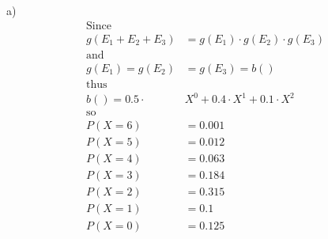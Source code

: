\documentclass[11pt]{article}
\begin{document}
a)
\begin{align*}
\text{Since}&\\
g(E_1 + E_2 + E_3) &= g(E_1) \cdot g(E_2) \cdot g(E_3)\\
\text{and}&\\
g(E_1) = g(E_2) &= g(E_3) = b()\\
\text{thus}&\\
b() = 0.5\cdot &X^0 + 0.4\cdot X^1 + 0.1\cdot X^2\\
\text{so}&\\
P(X = 6) &= 0.001\\
P(X = 5) &= 0.012\\
P(X = 4) &= 0.063\\
P(X = 3) &= 0.184\\
P(X = 2) &= 0.315\\
P(X = 1) &= 0.1\\
P(X = 0) &= 0.125\\
\end{align*}
\end{document}
